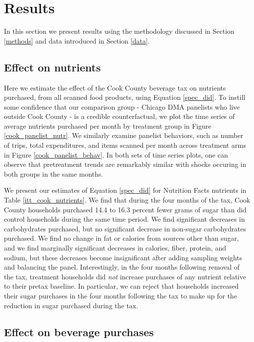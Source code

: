 \documentclass[12pt]{article}
\begin{document}

\section{Results} \label{results}
In this section we present results using the methodology discussed in Section \ref{methods} and data introduced in Section \ref{data}.

\subsection{Effect on nutrients}

Here we estimate the effect of the Cook County beverage tax on nutrients purchased, from all scanned food products, using Equation \ref{spec_did}. To instill some confidence that our comparison group - Chicago DMA panelists who live outside Cook County - is a credible counterfactual, we plot the time series of average nutrients purchased per month by treatment group in Figure \ref{cook_panelist_nutr}. We similarly examine panelist behaviors, such as number of trips, total expenditures, and items scanned per month across treatment arms in Figure \ref{cook_panelist_behav}. In both sets of time series plots, one can observe that pretreatment trends are remarkably similar with shocks occuring in both groups in the same months.

We present our estimates of Equation \ref{spec_did} for Nutrition Facts nutrients in Table \ref{itt_cook_nutrients}. We find that during the four months of the tax, Cook County households purchased 14.4 to 16.3 percent fewer grams of sugar than did control households during the same time period. We find significant decreases in carbohydrates purchased, but no significant decrease in non-sugar carbohydrates purchased. We find no change in fat or calories from sources other than sugar, and we find marginally significant decreases in calories, fiber, protein, and sodium, but these decreases become insignificant after adding sampling weights and balancing the panel. Interestingly, in the four months following removal of the tax, treatment households did \textit{not} increase purchases of any nutrient relative to their pretax baseline. In particular, we can reject that households increased their sugar purchases in the four months following the tax to make up for the reduction in sugar purchased during the tax.

\subsection{Effect on beverage purchases}
\end{document}
